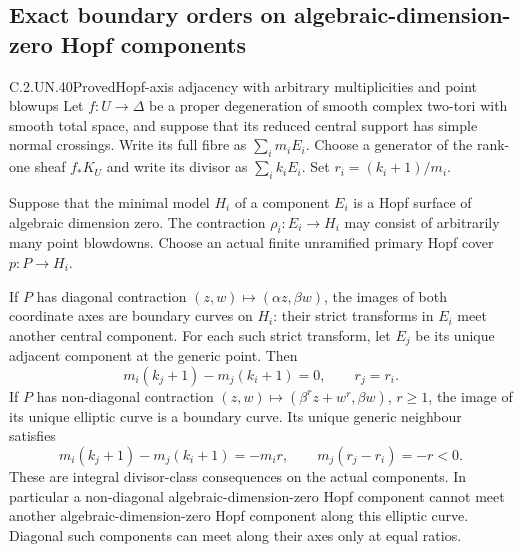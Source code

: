 \subsection{Exact boundary orders on algebraic-dimension-zero Hopf components}

\begin{statement}{C.2.UN.40}{Proved}{Hopf-axis adjacency with arbitrary multiplicities and point blowups}
Let $f:U\to\Delta$ be a proper degeneration of smooth complex
two-tori with smooth total space, and suppose that its reduced
central support has simple normal crossings. Write its full
fibre as $\sum_i m_iE_i$. Choose a generator of the rank-one
sheaf $f_*K_U$ and write its divisor as $\sum_i k_iE_i$.
Set $r_i=(k_i+1)/m_i$.

Suppose that the minimal model $H_i$ of a component $E_i$
is a Hopf surface of algebraic dimension zero. The contraction
$\rho_i:E_i\to H_i$ may consist of arbitrarily many point
blowdowns. Choose an actual finite unramified primary Hopf
cover $p:P\to H_i$.

If $P$ has diagonal contraction $(z,w)\mapsto(\alpha z,\beta w)$,
the images of both coordinate axes are boundary curves on
$H_i$: their strict transforms in $E_i$ meet another central
component. For each such strict transform, let $E_j$ be its
unique adjacent component at the generic point. Then
\[
                 m_i(k_j+1)-m_j(k_i+1)=0,
                 \qquad r_j=r_i.
\tag{C.HA.1}
\]
If $P$ has non-diagonal contraction
$(z,w)\mapsto(\beta^r z+w^r,\beta w)$, $r\geq1$, the image
of its unique elliptic curve is a boundary curve. Its unique
generic neighbour satisfies
\[
       m_i(k_j+1)-m_j(k_i+1)=-m_i r,
       \qquad m_j(r_j-r_i)=-r<0.
\tag{C.HA.2}
\]
These are integral divisor-class consequences on the actual
components. In particular a non-diagonal algebraic-dimension-zero
Hopf component cannot meet another algebraic-dimension-zero
Hopf component along this elliptic curve. Diagonal such
components can meet along their axes only at equal ratios.
\end{statement}

